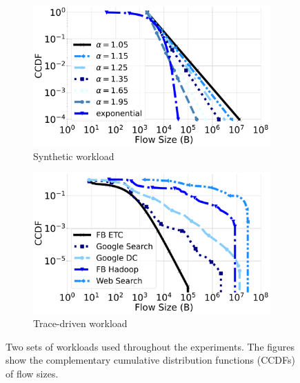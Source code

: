 \begin{figure}[t]
\centering
\begin{subfigure}[t]{0.49\linewidth}
    \centering
    \includegraphics[width=1\linewidth]{figs/syntheticcdf_fsize_large.pdf}
    \caption{Synthetic workload}
	\label{fig:filecdf-dist}
\end{subfigure}
\begin{subfigure}[t]{0.49\linewidth}
    \centering
    \includegraphics[width=1\linewidth]{figs/wccdf_fsize.pdf}
    \caption{Trace-driven workload}
	\label{fig:trace-ccdf}
\end{subfigure}
    \caption{\small{Two sets of workloads used throughout the experiments. The figures show the complementary cumulative distribution functions (CCDFs) of flow sizes.}}
	\label{fig:distributions}
\end{figure}


